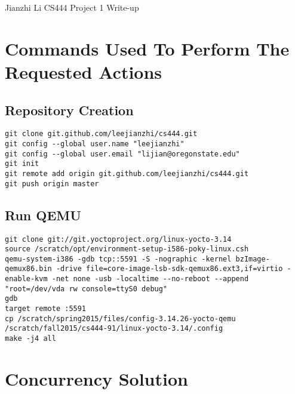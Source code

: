 \documentclass[letterpaper,11pt,titlepage]{article}
\begin{document}
Jianzhi Li\newline
CS444 Project 1 Write-up

\section{Commands Used To Perform The Requested Actions}


\subsection{Repository Creation}

\begin{lstlisting}
git clone git.github.com/leejianzhi/cs444.git
git config --global user.name "leejianzhi"
git config --global user.email "lijian@oregonstate.edu"
git init
git remote add origin git.github.com/leejianzhi/cs444.git
git push origin master
\end{lstlisting}


\subsection{Run QEMU}

\begin{lstlisting}
git clone git://git.yoctoproject.org/linux-yocto-3.14
source /scratch/opt/environment-setup-i586-poky-linux.csh
qemu-system-i386 -gdb tcp::5591 -S -nographic -kernel bzImage-qemux86.bin -drive file=core-image-lsb-sdk-qemux86.ext3,if=virtio -enable-kvm -net none -usb -localtime --no-reboot --append "root=/dev/vda rw console=ttyS0 debug"
gdb
target remote :5591
cp /scratch/spring2015/files/config-3.14.26-yocto-qemu /scratch/fall2015/cs444-91/linux-yocto-3.14/.config
make -j4 all
\end{lstlisting}

\section{Concurrency Solution}
\end{document}

